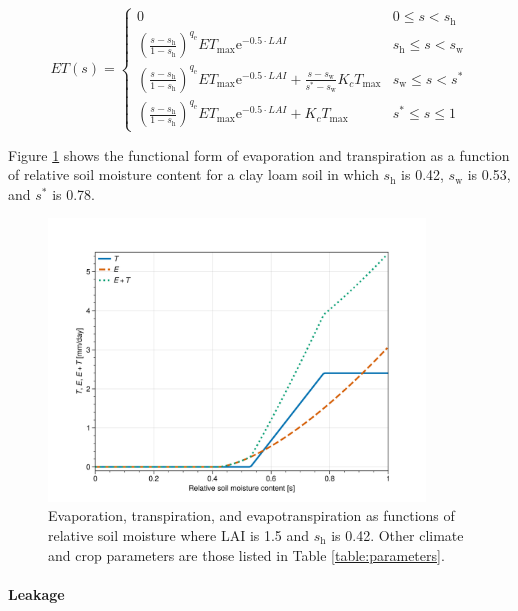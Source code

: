 \begin{equation}
\label{eq:ET2}
    ET(s) = \begin{cases}
    0   &   0 \leq s < s_{\text{h}}   \\[6pt]
    \left( \frac{s-s_{\text{h}}}{1-s_{\text{h}}} \right) ^{q_{\text{e}}} ET_{\text{max}} \mathrm{e}^{-0.5 \cdot LAI} 
        &   s_{\text{h}} \leq s < s_{\text{w}}   \\[6pt]

    \left( \frac{s-s_{\text{h}}}{1-s_{\text{h}}} \right) ^{q_{\text{e}}} ET_{\text{max}} \mathrm{e}^{-0.5 \cdot LAI} + \frac{s - s_{\text{w}}}{s^* - s_{\text{w}}} K_c T_{\text{max}} 
        &   s_{\text{w}} \leq s < s^*   \\[6pt]
    \left( \frac{s-s_{\text{h}}}{1-s_{\text{h}}} \right) ^{q_{\text{e}}} ET_{\text{max}} \mathrm{e}^{-0.5 \cdot LAI} + 
    K_c T_{\text{max}}
        &   s^* \leq s \leq 1  
    \end{cases}
\end{equation}

Figure \ref{fig:et} shows the functional form of evaporation and transpiration as a function of relative soil moisture content for a clay loam soil in which $s_{\text{h}}$ is 0.42, $s_{\text{w}}$ is 0.53, and $s^{*}$ is 0.78.

\begin{figure}%
\centering
\includegraphics[width=100mm]{fig4_ET.png}
\caption{Evaporation, transpiration, and evapotranspiration as functions of relative soil moisture where LAI is 1.5 and $s_{\text{h}}$ is 0.42. Other climate and crop parameters are those listed in Table \ref{table:parameters}. }
\label{fig:et}
\end{figure}


\paragraph{Leakage}

